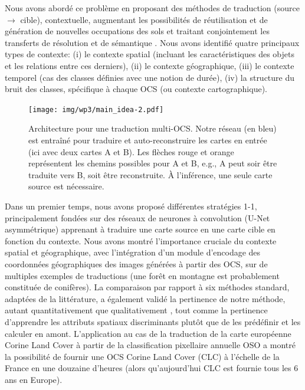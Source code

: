 Nous avons abordé ce problème en proposant des méthodes de traduction (source $\rightarrow$ cible), contextuelle, augmentant les possibilités de réutilisation et de génération de nouvelles occupations des sols et traitant conjointement les transferts de résolution et de sémantique \cite{Luc_IGARSS21}. Nous avons identifié quatre principaux types de contexte: (i) le contexte spatial (incluant les caractéristiques des objets et les relations entre ces derniers), (ii) le contexte géographique, (iii) le contexte temporel (cas des classes définies avec une notion de durée), (iv) la structure du bruit des classes, spécifique à chaque OCS (ou contexte cartographique).\\
     \begin{figure}[htbp]
        \centering%
        \texttt{[image: img/wp3/main\_idea-2.pdf]}
       \caption{Architecture pour une traduction multi-OCS. Notre réseau (en bleu) est entraîné pour traduire et auto-reconstruire les cartes en entrée (ici avec deux cartes A et B). Les flèches rouge et orange représentent les chemins possibles pour A et B, e.g., A peut soir être traduite vers B, soit être reconstruite. \`A l'inférence, une seule carte source est nécessaire.\label{fig:mlctnet}}
        \end{figure}
Dans un premier temps, nous avons proposé différentes stratégies 1-1, principalement fondées sur des réseaux de neurones à convolution (U-Net asymmétrique) apprenant à traduire une carte source en une carte cible en fonction du contexte. Nous avons montré l'importance cruciale du contexte spatial et géographique, avec l'intégration d'un module d'encodage des coordonnées géographiques des images générées à partir des OCS, sur de multiples exemples de traductions (une forêt en montagne est probablement constituée de conifères). La comparaison par rapport à six méthodes standard, adaptées de la littérature, a également validé la pertinence de notre méthode, autant quantitativement que qualitativement \cite{Luc_RS}, tout comme la pertinence d'apprendre les attributs spatiaux discriminants plutôt que de les prédéfinir et les calculer en amont. L'application au cas de la traduction de la carte européenne Corine Land Cover à partir de la classification pixellaire annuelle OSO a montré la possibilité de fournir une OCS Corine Land Cover (CLC) à l'échelle de la France en une douzaine d'heures (alors qu'aujourd'hui CLC est fournie tous les 6 ans en Europe). \\

